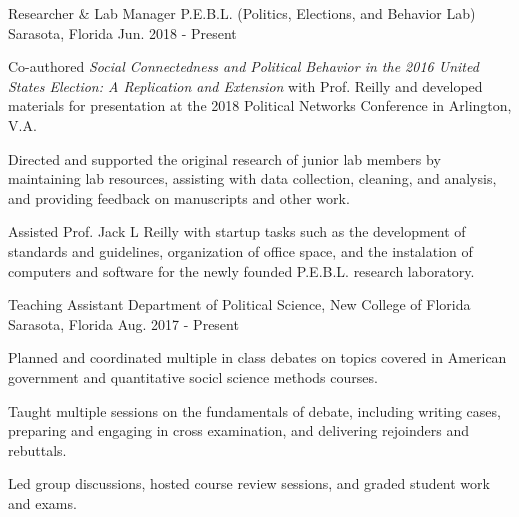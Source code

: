 

\begin{cventries}

    \cventry
      {Researcher \& Lab Manager} %
      {P.E.B.L. (Politics, Elections, and Behavior Lab)} %
      {Sarasota, Florida} %
      {Jun. 2018 - Present} %
      {
        \begin{cvitems} %
          \item {Co-authored \emph{Social Connectedness and Political Behavior in the 2016 United States Election: A Replication and Extension} with Prof. Reilly and developed materials for presentation at the 2018 Political Networks Conference in Arlington, V.A.}
          \item {Directed and supported the original research of junior lab members by maintaining lab resources, assisting with data collection, cleaning, and analysis, and providing feedback on manuscripts and other work.}
          \item {Assisted Prof. Jack L Reilly with startup tasks such as the development of standards and guidelines, organization of office space, and the instalation of computers and software for the newly founded P.E.B.L. research laboratory.}
      \end{cvitems}
      }

    \cventry
      {Teaching Assistant} %
      {Department of Political Science, New College of Florida} %
      {Sarasota, Florida} %
      {Aug. 2017 - Present} %
      {
        \begin{cvitems} %
          \item {Planned and coordinated multiple in class debates on topics covered in American government and quantitative socicl science methods courses.}
          \item {Taught multiple sessions on the fundamentals of debate, including writing cases, preparing and engaging in cross examination, and delivering rejoinders and rebuttals.}
          \item {Led group discussions, hosted course review sessions, and graded student work and exams.}
        \end{cvitems}
      }


\end{cventries}
